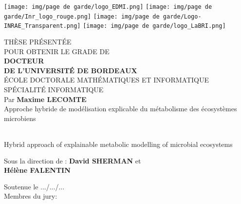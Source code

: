 \documentclass[french,12pt,a4paper]{report}
\begin{document}
	

\pagestyle{empty}
\texttt{[image: img/page de garde/logo\_EDMI.png]}
\hfill
\texttt{[image: img/page de garde/Inr\_logo\_rouge.png]}
\hfill
\texttt{[image: img/page de garde/Logo-INRAE\_Transparent.png]}
\hfill
\texttt{[image: img/page de garde/logo\_LaBRI.png]}
\begin{center}
\begin{Large}

THÈSE PRÉSENTÉE\\ POUR OBTENIR LE GRADE DE \\
{\LARGE \textbf{DOCTEUR\\DE L'UNIVERSITÉ DE BORDEAUX} } \\
\vspace{0.55cm}
ÉCOLE DOCTORALE MATHÉMATIQUES ET INFORMATIQUE\\
SPÉCIALITÉ INFORMATIQUE \\
\vspace{0.55cm}
Par \textbf{Maxime LECOMTE} \\
\vspace{0.55cm}
{\Large Approche hybride de modélisation explicable du métabolisme des écosystèmes microbiens}
\end{Large}\\
\vspace{0.55cm}
{\Large Hybrid approach of explainable metabolic modelling of microbial ecosystems}
\vspace{0.55cm}
\begin{normalsize}
\begin{singlespace}
Sous la direction de : \textbf{David SHERMAN} et \\ 
\textbf{Hélène FALENTIN}\\
\end{singlespace}
\end{normalsize}
\end{center}
\vfill
Soutenue le .../.../... \\
\vfill
\noindent
Membres du jury:\\
\end{document}
